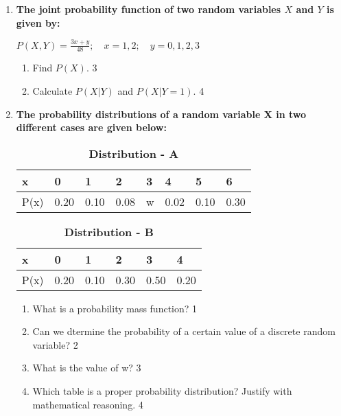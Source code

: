 \documentclass[a4paper,oneside, margin=1.4in]{book}
\begin{document}
\begin{enumerate}
  \item
  \textbf{The joint probability function of two random variables \( X \) and \( Y \) is given by:}
  
  \begin{center}
  \( \displaystyle P(X,Y) = \frac{3x + y}{48}; \quad x = 1, 2; \quad y = 0, 1, 2, 3 \)
  \end{center}
 
  \begin{enumerate}
    \item
    	Find \( P(X) \). \hfill 3
    \item
     	Calculate \( P(X \vert Y) \) and \( P(X \vert Y=1) \). \hfill 4
  \end{enumerate}



   \item
	  \textbf{The probability distributions of a random variable X in two different cases are given below:} 
	  
	  \begin{table}[!ht]
	  \caption {\textbf{Distribution - A}}
	   \begin{center}
\begin{tabular}{llllllll}
x    & 0    & 1    & 2    & 3 & 4    & 5    & 6    \\  \hline
P(x) & 0.20 & 0.10 & 0.08 & w & 0.02 & 0.10 & 0.30
\end{tabular}
 \end{center}
\end{table}

\begin{table}[h]
	  \caption {\textbf{Distribution - B}}
	   \begin{center}
\begin{tabular}{llllll}
x    & 0    & 1    & 2    & 3    & 4 \\ \hline
P(x) & 0.20 & 0.10 & 0.30 & 0.50 & 0.20   
\end{tabular}
\end{center}
\end{table}
  
  \begin{enumerate}
    \item
	What is a probability mass function? \hfill 1
    \item
	Can we dtermine the probability of a certain value of a discrete random variable? \hfill 2
    \item  
	What is the value of w? \hfill 3
    \item
	Which table is a proper probability distribution? Justify with mathematical reasoning. \hfill 4
  \end{enumerate}
  

\end{enumerate}
\end{document}
